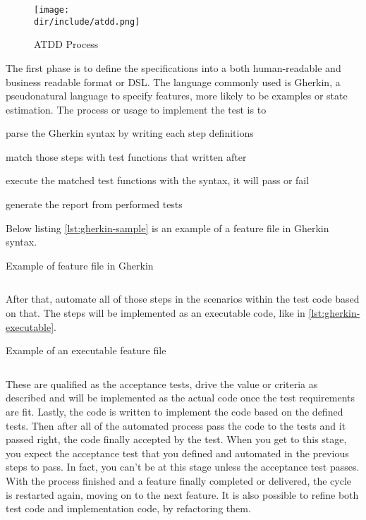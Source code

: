\begin{figure}[!htb]
    \centering
    \texttt{[image: \\dir/include/atdd.png]}
    \caption{ATDD Process}
    \label{fig:atdd}
\end{figure}

The first phase is to define the specifications into a both human-readable and business readable format or \ac{DSL}.
The language commonly used is Gherkin, a pseudonatural language to specify features, more likely to be examples or state estimation.
The process or usage to implement the test is to
\begin{inparaenum}[\itshape 1\upshape)]
\item parse the Gherkin syntax by writing each step definitions
\item match those steps with test functions that written after
\item execute the matched test functions with the syntax, it will pass or fail
\item generate the report from performed tests
\end{inparaenum}

Below listing \autoref{lst:gherkin-sample} is an example of a feature file in Gherkin syntax.

\begin{listing}[htb]
\caption{Example of feature file in Gherkin}
\inputminted{ruby}{\dir/include/gherkin-sample.txt}
\label{lst:gherkin-sample}
\end{listing}

After that, automate all of those steps in the scenarios within the test code based on that.
The steps will be implemented as an executable code, like in \autoref{lst:gherkin-executable}.

\begin{listing}[!htb]
\caption{Example of an executable feature file}
\inputminted{javascript}{\dir/include/gherkin-executable.js}
\label{lst:gherkin-executable}
\end{listing}

These are qualified as the acceptance tests, drive the value or criteria as described and will be implemented as the actual code once the test requirements are fit.
Lastly, the code is written to implement the code based on the defined tests.
Then after all of the automated process pass the code to the tests and it passed right, the code finally accepted by the test.
When you get to this stage, you expect the acceptance test that you defined and automated in the previous steps to pass. In fact, you can't be at this stage unless the acceptance test passes.
With the process finished and a feature finally completed or delivered, the cycle is restarted again, moving on to the next feature.
It is also possible to refine both test code and implementation code, by refactoring them.
